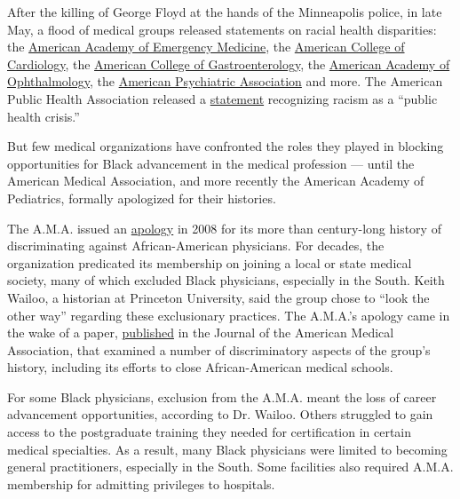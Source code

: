 After the killing of George Floyd at the hands of the Minneapolis
police, in late May, a flood of medical groups released statements on
racial health disparities: the
\href{https://www.aaem.org/current-news/death-of-george-floyd}{American
Academy of Emergency Medicine}, the
\href{https://www.cardiovascularbusiness.com/topics/healthcare-economics/george-floyd-cardiovascular-denounce-racism-violence}{American
College of Cardiology}, the
\href{https://gi.org/2020/05/30/a-message-from-the-acg-board-of-trustees/}{American
College of Gastroenterology}, the
\href{https://www.aao.org/newsroom/news-releases/detail/statement-on-death-of-george-floyd-its-aftermath}{American
Academy of Ophthalmology}, the
\href{https://www.psychiatry.org/newsroom/news-releases/apa-condemns-racism-in-all-forms-calls-for-end-to-racial-inequalities-in-u-s}{American
Psychiatric Association} and more. The American Public Health
Association released a
\href{https://www.apha.org/topics-and-issues/health-equity/racism-and-health/racism-declarations}{statement}
recognizing racism as a ``public health crisis.''

But few medical organizations have confronted the roles they played in
blocking opportunities for Black advancement in the medical profession
--- until the American Medical Association, and more recently the
American Academy of Pediatrics, formally apologized for their histories.

The A.M.A. issued an
\href{https://www.nytimes3xbfgragh.onion/2008/07/11/health/11ama.html}{apology}
in 2008 for its more than century-long history of discriminating against
African-American physicians. For decades, the organization predicated
its membership on joining a local or state medical society, many of
which excluded Black physicians, especially in the South. Keith Wailoo,
a historian at Princeton University, said the group chose to ``look the
other way'' regarding these exclusionary practices. The A.M.A.'s apology
came in the wake of a paper,
\href{https://jamanetwork.com/data/journals/JAMA/4424/jsc80005_306_313.pdf}{published}
in the Journal of the American Medical Association, that examined a
number of discriminatory aspects of the group's history, including its
efforts to close African-American medical schools.

For some Black physicians, exclusion from the A.M.A. meant the loss of
career advancement opportunities, according to Dr. Wailoo. Others
struggled to gain access to the postgraduate training they needed for
certification in certain medical specialties. As a result, many Black
physicians were limited to becoming general practitioners, especially in
the South. Some facilities also required A.M.A. membership for admitting
privileges to hospitals.

